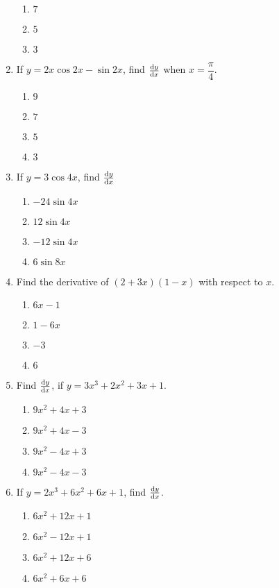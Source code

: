 \begin{multicols}{2}
\begin{enumerate}[label={\arabic*.}]
\begin{enumerate}[label={\Alph*.}]
	\item \(7\)
	\item \(5\)
	\item \(3\)
	\end{enumerate}
\item If \(y= 2x\cos{2x} -\sin{2x}\), find \(\dv{y}{x}\) when \(x=\dfrac{\pi}{4}\).
	\begin{enumerate}[label={\Alph*.}]
	\item \(9\)
	\item \(7\)
	\item \(5\)
	\item \(3\)
	\end{enumerate}
\item If \(y=3\cos{4x}\), find \(\dv{y}{x}\)
	\begin{enumerate}[label={\Alph*.}]
	\item \(-24\sin{4x}\)
	\item \(12\sin{4x}\)
	\item \(-12 \sin{4x}\)
	\item \(6\sin{8x}\)
	\end{enumerate}
\item Find the derivative of \((2+3x)(1-x)\) with respect to \(x\).
	\begin{enumerate}[label={\Alph*.}]
	\item \(6x-1\)
	\item \(1-6x\)
	\item \(-3\)
	\item \(6\)
	\end{enumerate}
\item Find \(\dv{y}{x}\), if \(y = 3{x}^{3}+2{x}^{2}+3x+1\).
	\begin{enumerate}[label={\Alph*.}]
	\item \(9{x}^{2}+4{x}+3\)
	\item \(9{x}^{2}+4{x}-3\)
	\item \(9{x}^{2}-4{x}+3\)
	\item \(9{x}^{2}-4{x}-3\)
	\end{enumerate}
\item If \(y = 2{x}^{3}+6{x}^{2}+6x+1\), find \(\dv{y}{x}\).
	\begin{enumerate}[label={\Alph*.}]
	\item \(6{x}^{2}+12{x}+1\)
	\item \(6{x}^{2}-12{x}+1\)
	\item \(6{x}^{2}+12{x}+6\)
	\item \(6{x}^{2}+6{x}+6\)
	\end{enumerate}

\end{enumerate}
\end{multicols}
